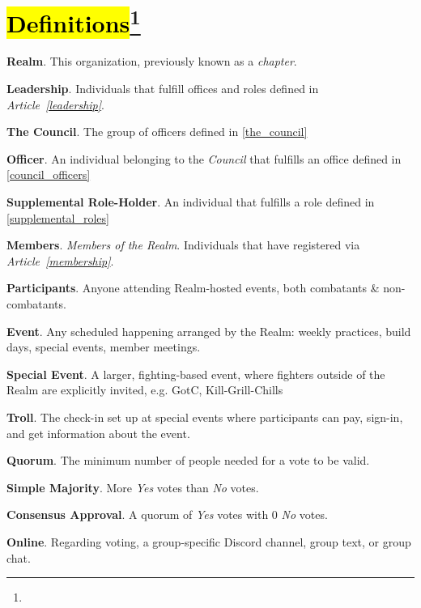 \documentclass[12pt]{article}
\newcommand{\newpart}[2][]{\hl{#2}\expandafter\ifx\expandafter\relax\detokenize{#1}\relax\else\textnormal{\footnote{#1}}\fi}
\begin{document}
\section{\newpart{Definitions}}
\begin{level}
    \item \textbf{Realm}. This organization, previously known as a \emph{chapter}.
    \item \textbf{Leadership}. Individuals that fulfill offices and roles defined in \emph{Article~\ref{leadership}}.
    \item \textbf{The Council}. The group of officers defined in \ref{the_council}
    \item \textbf{Officer}. An individual belonging to the \emph{Council} that fulfills an office defined in \ref{council_officers}
    \item \textbf{Supplemental Role-Holder}. An individual that fulfills a role defined in \ref{supplemental_roles}
    \item \textbf{Members}. \emph{Members of the Realm}. Individuals that have registered via \emph{Article~\ref{membership}}.
    \item \textbf{Participants}. Anyone attending Realm-hosted events, both combatants \& non-combatants.
    \item \textbf{Event}. Any scheduled happening arranged by the Realm: weekly practices, build days, special events, member meetings.
    \item \textbf{Special Event}. A larger, fighting-based event, where fighters outside of the Realm are explicitly invited, e.g. GotC, Kill-Grill-Chills
    \item \textbf{Troll}. The check-in set up at special events where participants can pay, sign-in, and get information about the event.
    \item \textbf{Quorum}. The minimum number of people needed for a vote to be valid.
    \item \textbf{Simple Majority}. More \emph{Yes} votes than \emph{No} votes.
    \item \textbf{Consensus Approval}. A quorum of \emph{Yes} votes with 0 \emph{No} votes.
    \item \textbf{Online}. Regarding voting, a group-specific Discord channel, group text, or group chat.
\end{level}
\end{document}
